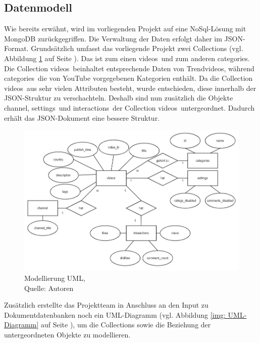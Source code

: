 \documentclass[12pt,titlepage]{article}
\begin{document}
\subsection{Datenmodell}
Wie bereits erwähnt, wird im vorliegenden Projekt auf eine NoSql-Lösung mit MongoDB zurückgegriffen. Die Verwaltung der Daten erfolgt daher im JSON-Format. Grundsätzlich umfasst das vorliegende Projekt zwei Collections (vgl. Abbildung \ref{img: Modellierung Collections} auf Seite \pageref{img: Modellierung Collections}). Das ist zum einen \glqq videos\grqq\, und zum anderen \glqq categories\grqq. Die Collection \glqq videos\grqq\, beinhaltet entsprechende Daten von Trendvideos, während \glqq categories\grqq\, die von YouTube vorgegebenen Kategorien enthält. Da die Collection \glqq videos\grqq\, aus sehr vielen Attributen besteht, wurde entschieden, diese innerhalb der JSON-Struktur zu verschachteln. Deshalb sind nun zusätzlich die Objekte \glqq channel\grqq, \glqq settings\grqq\, und \glqq interactions\grqq\, der Collection \glqq videos\grqq\, untergeordnet. Dadurch erhält das JSON-Dokument eine bessere Struktur.

\begin{figure}[h]
\centering
\includegraphics[width=15cm]{IMG/e.jpg}
\caption[Modellierung UML]{Modellierung UML,\\ Quelle: Autoren}
\label{img: Modellierung Collections}
\end{figure}

Zusätzlich erstellte das Projektteam in Anschluss an den Input zu Dokumentdatenbanken noch ein UML-Diagramm (vgl. Abbildung \ref{img: UML-Diagramm} auf Seite \pageref{img: UML-Diagramm}), um die Collections sowie die Beziehung der untergeordneten Objekte zu modellieren. 
\end{document}
